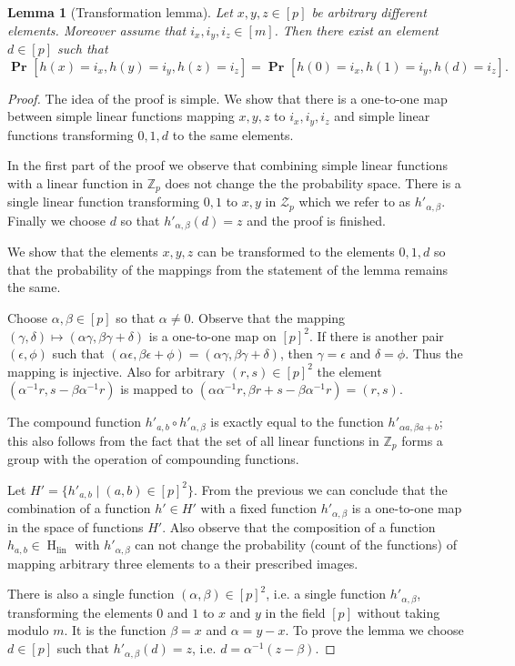 \documentclass{article}
\newcommand{\hlin}{\operatorname{H}_{\operatorname{lin}}}
\newcommand{\probs}[2]{\operatorname{\mathbf{Pr}}_{{#1}}\left[{#2}\right]}
\newcommand{\prob}[1]{\probs{}{#1}}
\newtheorem{lemma}{Lemma}
\begin{document}
\begin{lemma}[Transformation lemma]
\label{lemma:transformation}
Let $x, y, z \in [p]$ be arbitrary different elements. Moreover assume that $i_x, i_y, i_z \in [m]$. Then there exist an element $d \in [p]$ such that
\[
\prob{h(x) = i_x, h(y) = i_y,  h(z) = i_z} = \prob{h(0) = i_x, h(1) = i_y, h(d) = i_z}.
\]
\end{lemma}
\begin{proof}
The idea of the proof is simple. We show that there is a one-to-one map between simple linear functions mapping $x, y, z$ to $i_x, i_y, i_z$ and simple linear functions transforming $0, 1, d$ to the same elements.

In the first part of the proof we observe that combining simple linear functions with a linear function in $\mathbb{Z}_p$ does not change the the probability space.
There is a single linear function transforming $0, 1$ to $x, y$ in $\mathcal{Z}_p$ which we refer to as $h'_{\alpha,\beta}$.
Finally we choose $d$ so that $h'_{\alpha, \beta}(d) = z$ and the proof is finished.

We show that the elements $x, y, z$ can be transformed to the elements $0, 1, d$ so that the probability of the mappings from the statement of the lemma remains the same.

Choose $\alpha, \beta \in [p]$ so that $\alpha \neq 0$.
Observe that the mapping $(\gamma, \delta) \mapsto (\alpha \gamma, \beta \gamma + \delta)$ is a one-to-one map on $[p]^2$.
If there is another pair $(\epsilon, \phi)$ such that $(\alpha \epsilon, \beta \epsilon + \phi) = (\alpha \gamma, \beta \gamma + \delta)$, then $\gamma = \epsilon$ and $\delta = \phi$. Thus the mapping is injective.
Also for arbitrary $(r, s) \in [p]^2$ the element $(\alpha^{-1}r, s - \beta\alpha^{-1}r)$ is mapped to $(\alpha \alpha^{-1}r, \beta r + s - \beta\alpha^{-1}r) = (r, s)$.

The compound function $h'_{a, b} \circ h'_{\alpha, \beta}$ is exactly equal to the function $h'_{\alpha a, \beta a + b}$; this also follows from the fact that the set of all linear functions in $\mathbb{Z}_p$ forms a group with the operation of compounding functions. 

Let $H' = \{h'_{a, b} \mid (a, b) \in [p]^2\}$.
From the previous we can conclude that the combination of a function $h' \in H'$ with a fixed function $h'_{\alpha, \beta}$ is a one-to-one map in the space of functions $H'$.
Also observe that the composition of a function $h_{a, b} \in \hlin$ with $h'_{\alpha, \beta}$ can not change the probability (count of the functions) of mapping arbitrary three elements to a their prescribed images.

There is also a single function $(\alpha, \beta) \in [p] ^ 2$, i.e. a single function $h'_{\alpha, \beta}$, transforming the elements $0$ and $1$ to $x$ and $y$ in the field $[p]$ without taking modulo $m$. It is the function $\beta = x$ and $\alpha = y - x$.
To prove the lemma we choose $d \in [p]$ such that $h'_{\alpha, \beta}(d) = z$, i.e. $d = \alpha ^ {-1}(z - \beta)$.
\end{proof}
\end{document}
